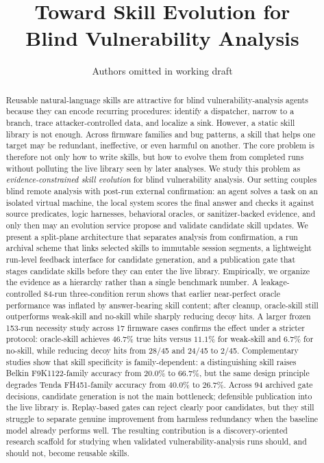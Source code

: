 ﻿\documentclass[preprint,12pt]{elsarticle}
\begin{document}
\begin{frontmatter}

\title{Toward Skill Evolution for\\
Blind Vulnerability Analysis}

\author[inst1]{Authors omitted in working draft}
\address[inst1]{Affiliations omitted in working draft}

\begin{abstract}
Reusable natural-language skills are attractive for blind
vulnerability-analysis agents because they can encode recurring procedures:
identify a dispatcher, narrow to a branch, trace attacker-controlled data,
and localize a sink.  However, a static skill library is not enough.
Across firmware families and bug patterns, a skill that helps one target may
be redundant, ineffective, or even harmful on another.  The core problem is
therefore not only how to write skills, but how to evolve them from
completed runs without polluting the live library seen by later analyses.
We study this problem as \emph{evidence-constrained skill evolution} for
blind vulnerability analysis.  Our setting couples blind remote analysis
with post-run external confirmation: an agent solves a task on an isolated
virtual machine, the local system scores the final answer and checks it
against source predicates, logic harnesses, behavioral oracles, or
sanitizer-backed evidence, and only then may an evolution service propose
and validate candidate skill updates.  We present a split-plane
architecture that separates analysis from confirmation, a run archival
scheme that links selected skills to immutable session segments, a
lightweight run-level feedback interface for candidate generation, and a
publication gate that stages candidate skills before they can enter the
live library.  Empirically, we organize the evidence as a hierarchy rather
than a single benchmark number.  A leakage-controlled 84-run three-condition
rerun shows that earlier near-perfect oracle performance was inflated by
answer-bearing skill content; after cleanup, oracle-skill still outperforms
weak-skill and no-skill while sharply reducing decoy hits.  A larger frozen
153-run necessity study across 17 firmware cases confirms the effect under a
stricter protocol: oracle-skill achieves $46.7\%$ true hits versus
$11.1\%$ for weak-skill and $6.7\%$ for no-skill, while reducing decoy hits
from 28/45 and 24/45 to 2/45.  Complementary studies show that skill
specificity is family-dependent: a distinguishing skill raises Belkin
F9K1122-family accuracy from $20.0\%$ to $66.7\%$, but the same design
principle degrades Tenda FH451-family accuracy from $40.0\%$ to $26.7\%$.
Across 94 archived gate decisions, candidate generation is not the main
bottleneck; defensible publication into the live library is.  Replay-based
gates can reject clearly poor candidates, but they still struggle to
separate genuine improvement from harmless redundancy when the baseline
model already performs well.  The resulting contribution is a
discovery-oriented research scaffold for studying when validated
vulnerability-analysis runs should, and should not, become reusable skills.
\end{abstract}


\end{frontmatter}
\end{document}
